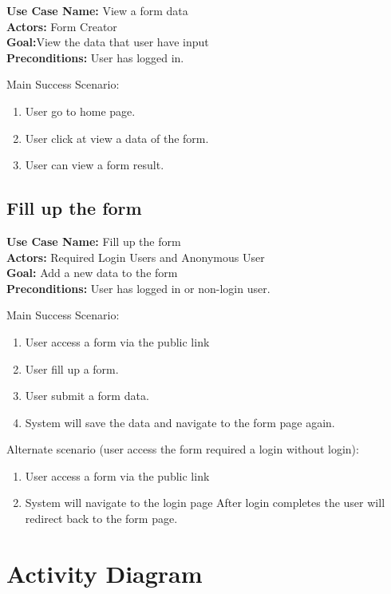\documentclass[12pt,oneside,openright,a4paper]{cpe-english-project}
\begin{document}
\noindent\textbf{Use Case Name:} View a form data \\
\textbf{Actors:} Form Creator\\
\textbf{Goal:}View the data that user have input\\
\textbf{Preconditions:} User has logged in.

Main Success Scenario: 

\begin{enumerate}
    \item User go to home page.
    \item User click at view a data of the form.
    \item User can view a form result.
\end{enumerate}

\subsection{Fill up the form}

\noindent\textbf{Use Case Name:} Fill up the form \\
\textbf{Actors:} Required Login Users and Anonymous User \\
\textbf{Goal:} Add a new data to the form \\
\textbf{Preconditions:} User has logged in or non-login user.

Main Success Scenario: 

\begin{enumerate}
    \item User access a form via the public link
    \item User fill up a form.
    \item User submit a form data.
    \item System will save the data and navigate to the form page again.
\end{enumerate}

Alternate scenario (user access the form required a login without login):

\begin{enumerate}
    \item User access a form via the public link
    \item System will navigate to the login page After login completes the user will redirect back to the form page.
\end{enumerate}

\newpage

\section{Activity Diagram}
\end{document}
